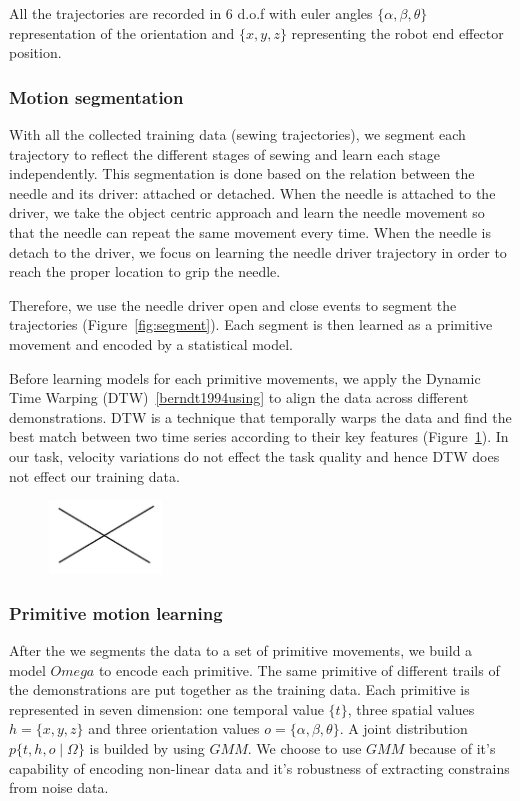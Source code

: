 All the trajectories are recorded in 6 d.o.f with euler angles $\{\alpha, \beta, \theta\}$ representation of the orientation and $\{x, y, z\}$ representing the robot end effector position.


\subsubsection{Motion segmentation}
With all the collected training data (sewing trajectories), we segment each trajectory to reflect the different stages of sewing and learn each stage independently. This segmentation is done based on the relation between the needle and its driver: attached or detached. When the needle is attached to the driver, we take the object centric approach and learn the needle movement so that the needle can repeat the same movement every time. When the needle is detach to the driver, we focus on learning the needle driver trajectory in order to reach the proper location to grip the needle. 

Therefore, we use the needle driver open and close events to segment the trajectories (Figure~\ref{fig:segment}). Each segment is then learned as a primitive movement and encoded by a statistical model.

Before learning models for each primitive movements, we apply the Dynamic Time Warping (DTW)~\ref{berndt1994using} to align the data across different demonstrations. DTW is a technique that temporally warps the data and find the best match between two time series according to their key features (Figure~\ref{fig:dtw}). In our task, velocity variations do not effect the task quality and hence DTW does not effect our training data.

\begin{figure}
\centering
{
\includegraphics[width=3cm]{./fig/void.jpg}
\label{fig:dtw}
}
\end{figure}

\subsubsection{Primitive motion learning}

After the we segments the data to a set of primitive movements, we build a model $Omega$ to encode each primitive. The same primitive of different trails of the demonstrations are put together as the training data. Each primitive is represented in seven dimension: one temporal value $\{t\}$, three spatial values $h=\{x, y, z\}$ and three orientation values $o=\{\alpha, \beta, \theta\}$. A joint distribution $p\{t,h,o\mid\Omega\}$ is builded by using $GMM$. We choose to use $GMM$ because of it's capability of encoding non-linear data and it's robustness of extracting constrains from noise data.

